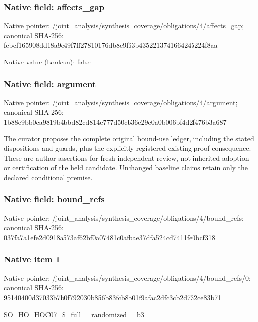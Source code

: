 \documentclass[10pt,a4paper]{article}
\begin{document}
\subsubsection{Native field: affects\_\allowbreak{}gap}
Native pointer: /joint\_\allowbreak{}analysis/synthesis\_\allowbreak{}coverage/obligations/4/affects\_\allowbreak{}gap; canonical SHA-256: fcbcf165908dd18a9e49f7ff27810176db8e9f63b4352213741664245224f8aa

Native value (boolean): false

\subsubsection{Native field: argument}
Native pointer: /joint\_\allowbreak{}analysis/synthesis\_\allowbreak{}coverage/obligations/4/argument; canonical SHA-256: 1b88e9bb0ca9819b4bbd82cd814e777d50cb36e29e0a0b006bf4d2f476b3a687

\begingroup\raggedright\sloppy The curator proposes the complete original bound-use ledger,\allowbreak{} including the stated dispositions and guards,\allowbreak{} plus the explicitly registered existing proof consequence. These are author assertions for fresh independent review,\allowbreak{} not inherited adoption or certification of the held candidate. Unchanged baseline claims retain only the declared conditional premise.\par\endgroup

\subsubsection{Native field: bound\_\allowbreak{}refs}
Native pointer: /joint\_\allowbreak{}analysis/synthesis\_\allowbreak{}coverage/obligations/4/bound\_\allowbreak{}refs; canonical SHA-256: 037fa7a1efe2d0918a573af62bf0a07481c0afbae37dfa524cd7411fe0bcf318

\subsubsection{Native item 1}
Native pointer: /joint\_\allowbreak{}analysis/synthesis\_\allowbreak{}coverage/obligations/4/bound\_\allowbreak{}refs/0; canonical SHA-256: 95140400d37033b7b0f792030b856b83fcb8b01f9afac2dfc3cb2d732ce83b71

\begingroup\raggedright\sloppy SO\_\allowbreak{}HO\_\allowbreak{}HOC07\_\allowbreak{}S\_\allowbreak{}full\_\allowbreak{}\_\allowbreak{}randomized\_\allowbreak{}\_\allowbreak{}b3\par\endgroup
\end{document}
